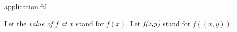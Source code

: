 \documentclass{stex}
\begin{document}
\begin{smodule}{application.ftl}


\begin{convention*}
  Let the \emph{value of $f$ at $x$} stand for $f(x)$.
  Let $\emph{f(x,y)}$ stand for $f((x,y))$.
\end{convention*}

\end{smodule}
\end{document}

